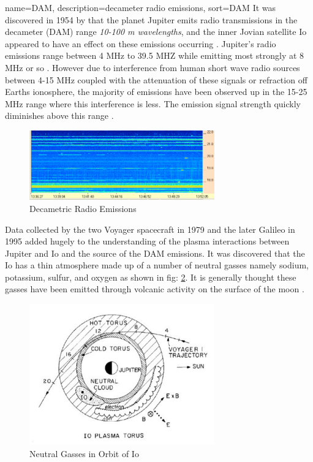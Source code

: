 \documentclass[runningheads,a4paper]{llncs}
\begin{document}
{
  name={DAM},
  description={decameter radio emissions},
  sort=DAM
}
%
It was discovered in 1954 by \cite{burke55} that the planet Jupiter emits radio transmissions in the decameter (\gls{DAM}) range \textit{10-100 m wavelengths}, and the inner Jovian satellite Io appeared to have an effect on these emissions occurring \citep{belcher87}. Jupiter's radio emissions range between 4 MHz to 39.5 MHZ while emitting most strongly at 8 MHz or so \citep{wilkinson94}. However due to interference from human short wave radio sources between 4-15 MHz coupled with the attenuation of these signals or refraction off Earths ionosphere, the majority of emissions have been observed up in the 15-25 MHz range where this interference is less. The emission signal strength quickly diminishes above this range \citep{wilkinson94}.
%
\begin{figure}[here]
\centering
\includegraphics[width=8cm]{images/01}
\caption{Decametric Radio Emissions \citep{ashcraft13}}
\label{fig:dam_Emissions}
\end{figure}
%
Data collected by the two Voyager spacecraft in 1979 \citep{belcher87} and the later Galileo in 1995 \citep{kivelson96} added hugely to the understanding of the plasma interactions between Jupiter and Io and the source of the \gls{DAM} emissions. It was discovered that the Io has a thin atmosphere made up of a number of neutral gasses namely sodium, potassium, sulfur, and oxygen as shown in fig: \ref{fig:io_neutral_gasses}. It is generally thought these gasses have been emitted through volcanic activity on the surface of the moon \citep{belcher87}.
%
\begin{figure}[here]
\centering
\includegraphics[width=8cm]{images/02}
\caption{Neutral Gasses in Orbit of Io \citep{belcher87}}
\label{fig:io_neutral_gasses}
\end{figure}
\end{document}
